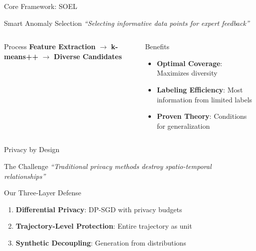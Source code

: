 \documentclass[aspectratio=169,xcolor={dvipsnames}]{beamer}
\begin{document}
\begin{frame}{Core Framework: SOEL \cite{liDeepAnomalyDetection2023}}
  \begin{block}{Smart Anomaly Selection}
    \centering
    \textit{``Selecting informative data points for expert feedback''}
  \end{block}
  
  \vspace{1em}
  \begin{columns}
    \begin{column}{0.6\textwidth}
      \begin{block}{Process}
        \centering
        \textbf{Feature Extraction} $\rightarrow$ \textbf{k-means++} $\rightarrow$ \textbf{Diverse Candidates}
      \end{block}
    \end{column}
    \begin{column}{0.4\textwidth}
      \begin{block}{Benefits}
        \begin{itemize}
          \item \textbf{Optimal Coverage}: Maximizes diversity
          \item \textbf{Labeling Efficiency}: Most information from limited labels
          \item \textbf{Proven Theory}: Conditions for generalization
        \end{itemize}
      \end{block}
    \end{column}
  \end{columns}
\end{frame}

\begin{frame}{Privacy by Design \cite{buchholzSystematisationKnowledgeTrajectory2024}}
  \begin{alertblock}{The Challenge}
    \centering
    \textit{``Traditional privacy methods destroy spatio-temporal relationships''}
  \end{alertblock}
  
  \vspace{1em}
  \begin{block}{Our Three-Layer Defense}
    \begin{enumerate}
      \item \textbf{Differential Privacy}: DP-SGD with privacy budgets
      \item \textbf{Trajectory-Level Protection}: Entire trajectory as unit
      \item \textbf{Synthetic Decoupling}: Generation from distributions
    \end{enumerate}
  \end{block}
\end{frame}
\end{document}

